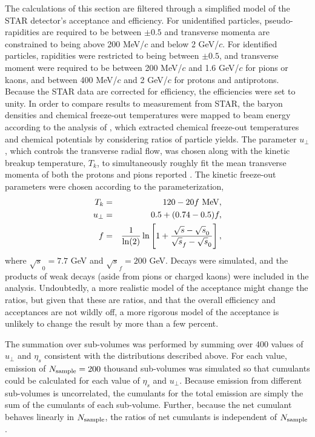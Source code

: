 The calculations of this section are filtered through a simplified model of the STAR detector's acceptance and efficiency. For unidentified particles, pseudo-rapidities are required to be between $\pm 0.5$ and transverse momenta are constrained to being above 200 MeV/$c$ and below 2 GeV/$c$. For identified particles, rapidities were restricted to being between $\pm 0.5$, and transverse moment were required to be between 200 MeV/$c$ and 1.6 GeV/$c$ for pions or kaons, and between 400 MeV/$c$ and 2 GeV/$c$ for protons and antiprotons. Because the STAR data are corrected for efficiency, the efficiencies were set to unity. In order to compare results to measurement from STAR, the baryon densities and chemical freeze-out temperatures were mapped to beam energy according to the analysis of \cite{Kumar:2012np}, which extracted chemical freeze-out temperatures and chemical potentials by considering ratios of particle yields. The parameter $u_\perp$, which controls the transverse radial flow, was chosen along with the kinetic breakup temperature, $T_k$, to simultaneously roughly fit the mean transverse momenta of both the protons and pions reported \cite{Abelev:2009bw}. The kinetic freeze-out parameters were chosen according to the parameterization,
\begin{eqnarray}
T_k&=&120-20f~{\rm MeV},\\
u_\perp&=&0.5+(0.74-0.5)f,\\
f&=&\frac{1}{\ln(2)}
\ln\left[ 1+ \frac{\sqrt{s}-\sqrt{s}_0}{\sqrt{s}_f-\sqrt{s}_0}\right],
\end{eqnarray}
where $\sqrt{s}_0=7.7$ GeV and $\sqrt{s}_f=200$ GeV. Decays were simulated, and the products of weak decays (aside from pions or charged kaons) were included in the analysis. Undoubtedly, a more realistic model of the acceptance might change the ratios, but given that these are ratios, and that the overall efficiency and acceptances are not wildly off, a more rigorous model of the acceptance is unlikely to change the result by more than a few percent.

The summation over sub-volumes was performed by summing over 400 values of $u_\perp$ and $\eta_s$ consistent with the distributions described above. For each value, emission of $N_{\rm sample}=200$ thousand sub-volumes was simulated so that cumulants could be calculated for each value of $\eta_s$ and $u_\perp$. Because emission from different sub-volumes is uncorrelated, the cumulants for the total emission are simply the sum of the cumulants of each sub-volume. Further, because the net cumulant behaves linearly in $N_{\rm sample}$, the ratios of net cumulants is independent of $N_{\rm sample}$.

